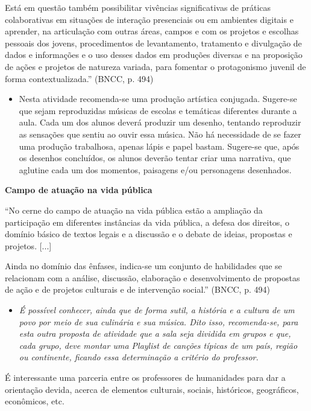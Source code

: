 \documentclass[12pt]{extarticle}
\begin{document}
Está em questão também possibilitar vivências significativas de práticas
colaborativas em situações de interação presenciais ou em ambientes
digitais e aprender, na articulação com outras áreas, campos e com os
projetos e escolhas pessoais dos jovens, procedimentos de levantamento,
tratamento e divulgação de dados e informações e o uso desses dados em
produções diversas e na proposição de ações e projetos de natureza
variada, para fomentar o protagonismo juvenil de forma
contextualizada.'' (BNCC, p. 494)

\begin{itemize}
\item
  Nesta atividade recomenda-se uma produção artística conjugada.
  Sugere-se que sejam reproduzidas músicas de escolas e temáticas
  diferentes durante a aula. Cada um dos alunos deverá produzir um
  desenho, tentando reproduzir as sensações que sentiu ao ouvir essa
  música. Não há necessidade de se fazer uma produção trabalhosa, apenas
  lápis e papel bastam. Sugere-se que, após os desenhos concluídos, os
  alunos deverão tentar criar uma narrativa, que aglutine cada um dos
  momentos, paisagens e/ou personagens desenhados.
\end{itemize}

\textbf{Campo de atuação na vida pública}

``No cerne do campo de atuação na vida pública estão a ampliação da
participação em diferentes instâncias da vida pública, a defesa dos
direitos, o domínio básico de textos legais e a discussão e o debate de
ideias, propostas e projetos. {[}...{]}

Ainda no domínio das ênfases, indica-se um conjunto de habilidades que
se relacionam com a análise, discussão, elaboração e desenvolvimento de
propostas de ação e de projetos culturais e de intervenção social.''
(BNCC, p. 494)

\begin{itemize}
\item
  \textit{É possível conhecer, ainda que de forma sutil, a história e a
  cultura de um povo por meio de sua culinária e sua música. Dito isso,
  recomenda-se, para esta outra proposta de atividade que a sala seja
  dividida em grupos e que, cada grupo, deve montar uma Playlist de
  canções típicas de um país, região ou continente, ficando essa
  determinação a critério do professor.}
\end{itemize}

{É interessante uma parceria entre os professores de humanidades
para dar a orientação devida, acerca de elementos culturais, sociais,
históricos, geográficos, econômicos, etc.}
\end{document}
